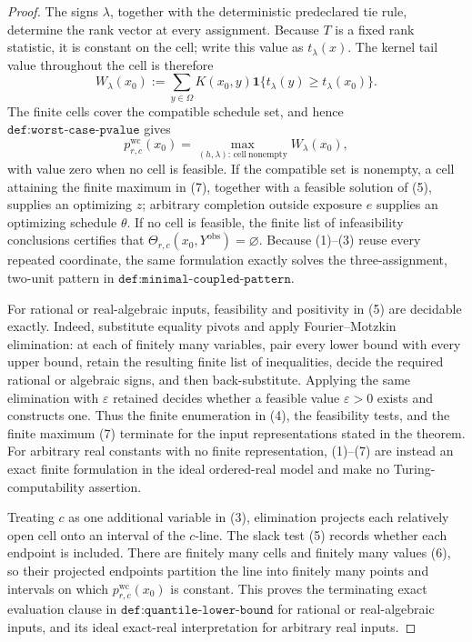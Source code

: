 \documentclass{article}
\begin{document}
\begin{proof}
The signs \(\lambda\), together with the deterministic predeclared tie rule, determine the rank vector at every assignment.  Because \(T\) is a fixed rank statistic, it is constant on the cell; write this value as \(t_\lambda(x)\).  The kernel tail value throughout the cell is therefore
\[
 W_\lambda(x_0)
 :=\sum_{y\in\Omega}K(x_0,y)
 \mathbf 1\{t_\lambda(y)\geq t_\lambda(x_0)\}.
\tag{6}
\]
The finite cells cover the compatible schedule set, and hence \(\texttt{def:worst-case-pvalue}\) gives
\[
 p^{\mathrm{wc}}_{r,c}(x_0)
 =\max_{(h,\lambda):\,\mathrm{cell\ nonempty}}W_\lambda(x_0),
\tag{7}
\]
with value zero when no cell is feasible.  If the compatible set is nonempty, a cell attaining the finite maximum in (7), together with a feasible solution of (5), supplies an optimizing \(z\); arbitrary completion outside exposure \(e\) supplies an optimizing schedule \(\theta\).  If no cell is feasible, the finite list of infeasibility conclusions certifies that \(\Theta_{r,c}(x_0,Y^{\mathrm{obs}})=\varnothing\).  Because (1)--(3) reuse every repeated coordinate, the same formulation exactly solves the three-assignment, two-unit pattern in \(\texttt{def:minimal-coupled-pattern}\).

For rational or real-algebraic inputs, feasibility and positivity in (5) are decidable exactly.  Indeed, substitute equality pivots and apply Fourier--Motzkin elimination: at each of finitely many variables, pair every lower bound with every upper bound, retain the resulting finite list of inequalities, decide the required rational or algebraic signs, and then back-substitute.  Applying the same elimination with \(\varepsilon\) retained decides whether a feasible value \(\varepsilon>0\) exists and constructs one.  Thus the finite enumeration in (4), the feasibility tests, and the finite maximum (7) terminate for the input representations stated in the theorem.  For arbitrary real constants with no finite representation, (1)--(7) are instead an exact finite formulation in the ideal ordered-real model and make no Turing-computability assertion.

Treating \(c\) as one additional variable in (3), elimination projects each relatively open cell onto an interval of the \(c\)-line.  The slack test (5) records whether each endpoint is included.  There are finitely many cells and finitely many values (6), so their projected endpoints partition the line into finitely many points and intervals on which \(p^{\mathrm{wc}}_{r,c}(x_0)\) is constant.  This proves the terminating exact evaluation clause in \(\texttt{def:quantile-lower-bound}\) for rational or real-algebraic inputs, and its ideal exact-real interpretation for arbitrary real inputs.


\end{proof}
\end{document}
